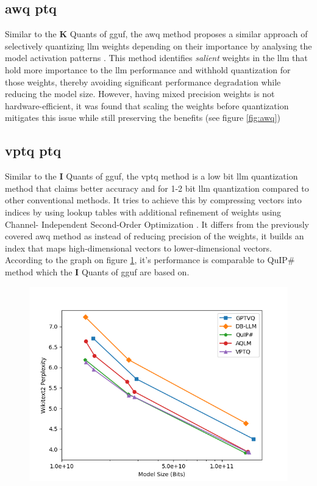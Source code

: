 \documentclass{ifacconf}
\begin{document}
	\subsection{\gls{awq} \gls{ptq}}
	
	Similar to the \textbf{K} Quants of \gls{gguf}, the \gls{awq} method proposes a similar approach of selectively quantizing \gls{llm} weights depending on their importance by analysing the model activation patterns \cite{lin2024awqactivationawareweightquantization}. This method identifies \textit{salient} weights in the \gls{llm} that hold more importance to the \gls{llm} performance and withhold quantization for those weights, thereby avoiding significant performance degradation while reducing the model size. However, having  mixed precision weights is not hardware-efficient, it was found that scaling the weights before quantization mitigates this issue while still preserving the benefits (see figure \ref{fig:awq})
	
	\subsection{\gls{vptq} \gls{ptq}}
	
	Similar to the \textbf{I} Quants of \gls{gguf}, the \gls{vptq} method is a low bit \gls{llm} quantization method that claims better accuracy and for 1-2 bit \gls{llm} quantization compared to other conventional methods. It tries to achieve this by compressing vectors into indices by using lookup tables with additional refinement of weights using Channel-
	Independent Second-Order Optimization \cite{liu2024vptqextremelowbitvector}. It differs from the previously covered \gls{awq} method as instead of reducing precision of the weights, it builds an index that maps high-dimensional vectors to lower-dimensional vectors. According to the graph on figure \ref{fig:vptq}, it's performance is comparable to QuIP\# method which the \textbf{I} Quants of \gls{gguf} are based on.
	
	\begin{figure}[h]
		\includegraphics[width=1.1\linewidth]{vptq}
		\label{fig:vptq}
	\end{figure}
	
\end{document}
